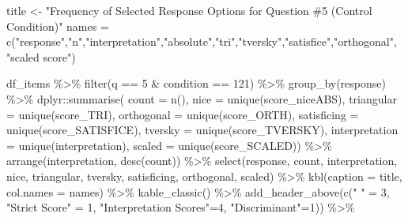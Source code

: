 \documentclass[
  letterpaper,
  DIV=11,
  numbers=noendperiod]{scrreprt}
\newenvironment{Shaded}{\begin{snugshade}}{\end{snugshade}}
\newcommand{\AttributeTok}[1]{\textcolor[rgb]{0.40,0.45,0.13}{#1}}
\newcommand{\DecValTok}[1]{\textcolor[rgb]{0.68,0.00,0.00}{#1}}
\newcommand{\FunctionTok}[1]{\textcolor[rgb]{0.28,0.35,0.67}{#1}}
\newcommand{\NormalTok}[1]{\textcolor[rgb]{0.00,0.23,0.31}{#1}}
\newcommand{\OtherTok}[1]{\textcolor[rgb]{0.00,0.23,0.31}{#1}}
\newcommand{\SpecialCharTok}[1]{\textcolor[rgb]{0.37,0.37,0.37}{#1}}
\newcommand{\StringTok}[1]{\textcolor[rgb]{0.13,0.47,0.30}{#1}}
\begin{document}
\begin{Shaded}
\begin{Highlighting}[]
\NormalTok{title }\OtherTok{\textless{}{-}} \StringTok{"Frequency of Selected Response Options for Question \#5 (Control Condition)"}
\NormalTok{names }\OtherTok{=} \FunctionTok{c}\NormalTok{(}\StringTok{"response"}\NormalTok{,}\StringTok{"n"}\NormalTok{,}\StringTok{"interpretation"}\NormalTok{,}\StringTok{"absolute"}\NormalTok{,}\StringTok{"tri"}\NormalTok{,}\StringTok{"tversky"}\NormalTok{,}\StringTok{"satisfice"}\NormalTok{,}\StringTok{"orthogonal"}\NormalTok{, }\StringTok{"scaled score"}\NormalTok{)}

\NormalTok{df\_items }\SpecialCharTok{\%\textgreater{}\%} \FunctionTok{filter}\NormalTok{(q }\SpecialCharTok{==} \DecValTok{5} \SpecialCharTok{\&}\NormalTok{ condition }\SpecialCharTok{==} \DecValTok{121}\NormalTok{) }\SpecialCharTok{\%\textgreater{}\%} \FunctionTok{group\_by}\NormalTok{(response) }\SpecialCharTok{\%\textgreater{}\%} 
\NormalTok{  dplyr}\SpecialCharTok{::}\FunctionTok{summarise}\NormalTok{( }\AttributeTok{count =} \FunctionTok{n}\NormalTok{(), }
                    \AttributeTok{nice =} \FunctionTok{unique}\NormalTok{(score\_niceABS),}
                    \AttributeTok{triangular =} \FunctionTok{unique}\NormalTok{(score\_TRI), }
                    \AttributeTok{orthogonal =}  \FunctionTok{unique}\NormalTok{(score\_ORTH),}
                    \AttributeTok{satisficing =}  \FunctionTok{unique}\NormalTok{(score\_SATISFICE),}
                    \AttributeTok{tversky =} \FunctionTok{unique}\NormalTok{(score\_TVERSKY),}
                    \AttributeTok{interpretation =} \FunctionTok{unique}\NormalTok{(interpretation),}
                    \AttributeTok{scaled =} \FunctionTok{unique}\NormalTok{(score\_SCALED)) }\SpecialCharTok{\%\textgreater{}\%} 
  \FunctionTok{arrange}\NormalTok{(interpretation, }\FunctionTok{desc}\NormalTok{(count)) }\SpecialCharTok{\%\textgreater{}\%} 
  \FunctionTok{select}\NormalTok{(response, count, interpretation, nice, }
\NormalTok{         triangular, tversky, satisficing, orthogonal, scaled) }\SpecialCharTok{\%\textgreater{}\%} 
  \FunctionTok{kbl}\NormalTok{(}\AttributeTok{caption =}\NormalTok{ title, }\AttributeTok{col.names =}\NormalTok{ names) }\SpecialCharTok{\%\textgreater{}\%}  \FunctionTok{kable\_classic}\NormalTok{() }\SpecialCharTok{\%\textgreater{}\%} 
  \FunctionTok{add\_header\_above}\NormalTok{(}\FunctionTok{c}\NormalTok{(}\StringTok{" "} \OtherTok{=} \DecValTok{3}\NormalTok{, }\StringTok{"Strict Score"} \OtherTok{=} \DecValTok{1}\NormalTok{, }\StringTok{"Interpretation Scores"}\OtherTok{=}\DecValTok{4}\NormalTok{, }\StringTok{"Discriminant"}\OtherTok{=}\DecValTok{1}\NormalTok{)) }\SpecialCharTok{\%\textgreater{}\%}

\end{Highlighting}
\end{Shaded}
\end{document}

